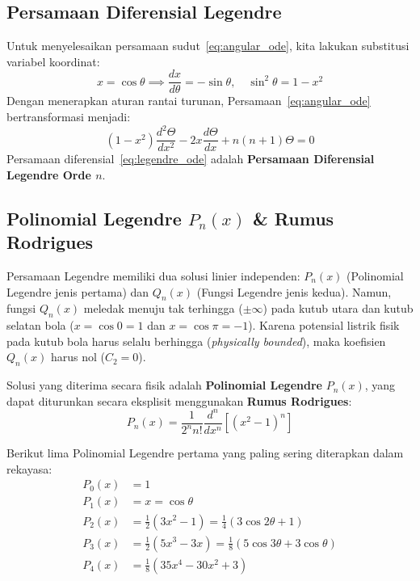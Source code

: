 \documentclass[11pt,a4paper]{article}
\theoremstyle{definition}
\begin{document}
\subsection{Persamaan Diferensial Legendre}
Untuk menyelesaikan persamaan sudut~\eqref{eq:angular_ode}, kita lakukan substitusi variabel koordinat:
\begin{equation}
    x = \cos\theta \implies \frac{dx}{d\theta} = -\sin\theta, \quad \sin^2\theta = 1 - x^2
\end{equation}
Dengan menerapkan aturan rantai turunan, Persamaan~\eqref{eq:angular_ode} bertransformasi menjadi:
\begin{equation}
    (1 - x^2) \frac{d^2 \Theta}{dx^2} - 2x \frac{d\Theta}{dx} + n(n+1)\Theta = 0
    \label{eq:legendre_ode}
\end{equation}
Persamaan diferensial~\eqref{eq:legendre_ode} adalah \textbf{Persamaan Diferensial Legendre Orde $n$}.

\subsection{Polinomial Legendre \texorpdfstring{$P_n(x)$}{P\_n(x)} \& Rumus Rodrigues}
Persamaan Legendre memiliki dua solusi linier independen: $P_n(x)$ (Polinomial Legendre jenis pertama) dan $Q_n(x)$ (Fungsi Legendre jenis kedua). Namun, fungsi $Q_n(x)$ meledak menuju tak terhingga ($\pm \infty$) pada kutub utara dan kutub selatan bola ($x = \cos 0 = 1$ dan $x = \cos\pi = -1$). Karena potensial listrik fisik pada kutub bola harus selalu berhingga (\textit{physically bounded}), maka koefisien $Q_n(x)$ harus nol ($C_2 = 0$).

Solusi yang diterima secara fisik adalah \textbf{Polinomial Legendre} $P_n(x)$, yang dapat diturunkan secara eksplisit menggunakan \textbf{Rumus Rodrigues}:
\begin{equation}
    P_n(x) = \frac{1}{2^n n!} \frac{d^n}{dx^n} \left[ (x^2 - 1)^n \right]
    \label{eq:rodrigues_formula}
\end{equation}

Berikut lima Polinomial Legendre pertama yang paling sering diterapkan dalam rekayasa:
\begin{align}
    P_0(x) &= 1 \\
    P_1(x) &= x = \cos\theta \\
    P_2(x) &= \frac{1}{2}(3x^2 - 1) = \frac{1}{4}(3\cos 2\theta + 1) \\
    P_3(x) &= \frac{1}{2}(5x^3 - 3x) = \frac{1}{8}(5\cos 3\theta + 3\cos\theta) \\
    P_4(x) &= \frac{1}{8}(35x^4 - 30x^2 + 3)
\end{align}
\end{document}
